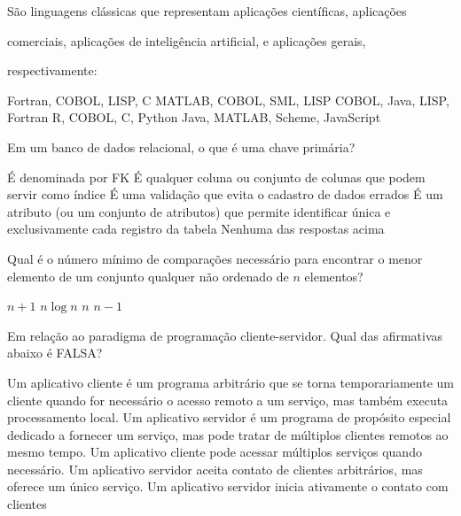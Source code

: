 \documentclass[12pt, addpoints]{exam}
\begin{document}
\begin{questions}
\question

São linguagens clássicas que representam aplicações científicas, aplicações 

comerciais, aplicações de inteligência artificial, e aplicações gerais,

respectivamente:
\begin{choices}
\choice Fortran, COBOL, LISP, C
\choice MATLAB, COBOL, SML, LISP
\choice COBOL, Java, LISP, Fortran
\choice R, COBOL, C, Python
\choice Java, MATLAB, Scheme, JavaScript
\end{choices}

\question

Em um banco de dados relacional, o que é uma chave primária?


\begin{choices}
\choice É denominada por FK
\choice É qualquer coluna ou conjunto de colunas que podem servir como índice
\choice É uma validação que evita o cadastro de dados errados
\choice É um atributo (ou um conjunto de atributos) que permite identificar única e exclusivamente cada registro da tabela
\choice Nenhuma das respostas acima
\end{choices}

\question

Qual é o número mínimo de comparações necessário para encontrar o menor elemento de um conjunto qualquer não ordenado de \( n \) elementos?
\begin{choices}
\choice \( n + 1 \)
\choice \( n \log n \)
\choice \( n \)
\choice \( n - 1 \)
\end{choices}

\question

Em relação ao paradigma de programação cliente-servidor. Qual das afirmativas abaixo é FALSA?
\begin{choices}
\choice Um aplicativo cliente é um programa arbitrário que se torna temporariamente um cliente quando for necessário o acesso remoto a um serviço, mas também executa processamento local.
\choice Um aplicativo servidor é um programa de propósito especial dedicado a fornecer um serviço, mas pode tratar de múltiplos clientes remotos ao mesmo tempo. 
\choice Um aplicativo cliente pode acessar múltiplos serviços quando necessário.
\choice Um aplicativo servidor aceita contato de clientes arbitrários, mas oferece um único serviço. 
\choice Um aplicativo servidor inicia ativamente o contato com clientes 
\end{choices}

\question


\end{questions}
\end{document}
